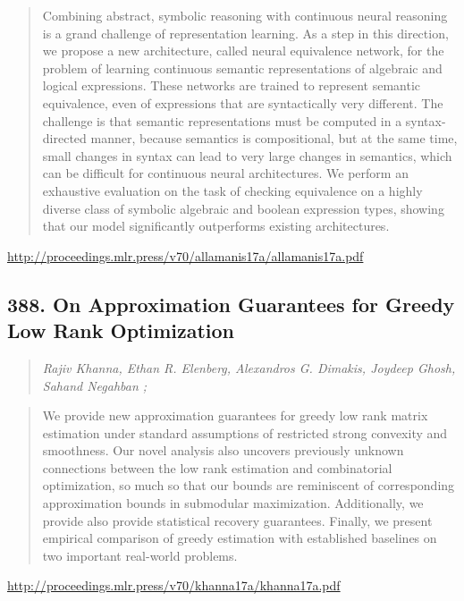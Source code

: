 \documentclass{article}
\begin{document}
\begin{quote}
    Combining abstract, symbolic reasoning with continuous neural reasoning is a grand challenge of representation learning. As a step in this direction, we propose a new architecture, called neural equivalence network, for the problem of learning continuous semantic representations of algebraic and logical expressions. These networks are trained to represent semantic equivalence, even of expressions that are syntactically very different. The challenge is that semantic representations must be computed in a syntax-directed manner, because semantics is compositional, but at the same time, small changes in syntax can lead to very large changes in semantics, which can be difficult for continuous neural architectures. We perform an exhaustive evaluation on the task of checking equivalence on a highly diverse class of symbolic algebraic and boolean expression types, showing that our model significantly outperforms existing architectures.  
\end{quote}

\href{http://proceedings.mlr.press/v70/allamanis17a/allamanis17a.pdf}{http://proceedings.mlr.press/v70/allamanis17a/allamanis17a.pdf}

\subsection{388. On Approximation Guarantees for Greedy Low Rank Optimization}

\begin{quote}
\footnotesize{\textit{Rajiv Khanna, Ethan R. Elenberg, Alexandros G. Dimakis, Joydeep Ghosh, Sahand Negahban ;}}

\end{quote}

\begin{quote}
    We provide new approximation guarantees for greedy low rank matrix estimation under standard assumptions of restricted strong convexity and smoothness. Our novel analysis also uncovers previously unknown connections between the low rank estimation and combinatorial optimization, so much so that our bounds are reminiscent of corresponding approximation bounds in submodular maximization. Additionally, we provide also provide statistical recovery guarantees. Finally, we present empirical comparison of greedy estimation with established baselines on two important real-world problems.  
\end{quote}

\href{http://proceedings.mlr.press/v70/khanna17a/khanna17a.pdf}{http://proceedings.mlr.press/v70/khanna17a/khanna17a.pdf}
\end{document}
